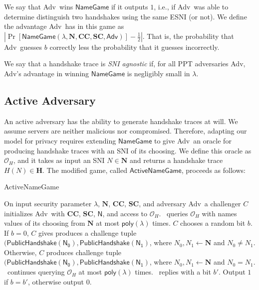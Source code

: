 \documentclass{article}
\newcommand{\adv}{{\sf Adv}}
\newcommand{\madv}{\mathsf{Adv}}
\begin{document}
We say that \adv\ wins $\mathsf{NameGame}$ if it outputs $1$, i.e., if \adv\ was able to determine distinguish 
two handshakes using the same ESNI (or not). We define the advantage \adv\ has in this game as
$|\Pr[\mathsf{NameGame}(\lambda, \mathbf{N}, \mathbf{CC}, \mathbf{SC}, \madv)] - \frac{1}{2}|$. That is, 
the probability that \adv\ guesses $b$ correctly less the probability that it guesses incorrectly. 

We say that a handshake trace is \emph{SNI agnostic} if, for all PPT adversaries \adv, \adv's advantage in 
winning $\mathsf{NameGame}$ is negligibly small in $\lambda$. 


\subsection{Active Adversary}

An active adversary has the ability to generate handshake traces at will. We assume servers are neither malicious nor compromised. 
Therefore, adapting our model for privacy requires extending $\mathsf{NameGame}$ to give \adv\ an oracle for producing handshake
traces with an SNI of its choosing. We define this oracle as $\mathcal{O}_H$, and it takes as input an SNI $N \in \mathbf{N}$
and returns a handshake trace $H(N) \in \mathbf{H}$. The modified game, called $\mathsf{ActiveNameGame}$, proceeds as follows:

\begin{algorithm}
\caption{{\sf ActiveNameGame}} 
\label{alg:active-esnigame}
\begin{algorithmic}[1]
  \STATE On input security parameter $\lambda$, $\mathbf{N}$, $\mathbf{CC}$, $\mathbf{SC}$, and adversary \adv\, a challenger $C$ initializes \adv\ with $\mathbf{CC}$, $\mathbf{SC}$, $\mathsf{N}$, and access to $\mathcal{O}_H$.
  \STATE \adv\ queries $\mathcal{O}_H$ with names values of its choosing from $\mathbf{N}$ at most $\mathsf{poly}(\lambda)$ times.
  \STATE $C$ chooses a random bit $b$. If $b = 0$, $C$ gives produces a challenge tuple
  $(\mathsf{PublicHandshake(N_0)}, \mathsf{PublicHandshake(N_1)}$, where 
  $N_0,N_1 \gets \mathbf{N}$ and $N_0 \not= N_1$.
  Otherwise, $C$ produces challenge tuple 
  $(\mathsf{PublicHandshake(N_0)}, \mathsf{PublicHandshake(N_1)}$, where 
  $N_0,N_1 \gets \mathbf{N}$ and $N_0 = N_1$.
  \STATE \adv\ continues querying $\mathcal{O}_H$ at most $\mathsf{poly}(\lambda)$ times.
  \STATE \adv\ replies with a bit $b'$.
  \STATE Output $1$ if $b = b'$, otherwise output $0$.
\end{algorithmic}
\end{algorithm}
\end{document}
